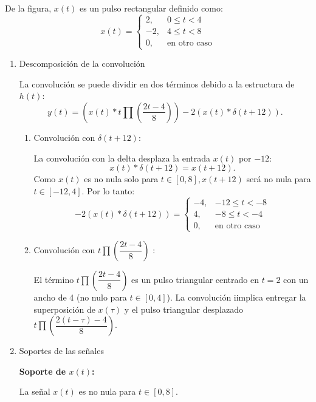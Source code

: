 \begin{enumerate}[label=\color{red}\textbf{\arabic*)}]
\begin{enumerate}[label=\color{red}\textbf{\alph*)}]
        De la figura, $x(t)$ es un pulso rectangular definido como:  \[
        x(t)=\begin{cases}
            2, & 0\le t<4\\
            -2, & 4\le t<8\\
            0, & \text{en otro caso}
        \end{cases}
        \] 
        \begin{enumerate}[label=Paso \arabic*:]
            \item Descomposición de la convolución

                La convolución se puede dividir en dos términos debido a la estructura de $h(t)$:
                 \[
                y(t)=\left( x(t)\ast t\prod\left( \dfrac{2t-4}{8} \right)  \right) -2(x(t)\ast\delta(t+12)).
                \] 
                \begin{enumerate}[label=\alph*)]
                    \item Convolución con $\delta(t+12)$:

                        La convolución con la delta desplaza la entrada  $x(t)$ por $-12$:  \[
                        x(t)\ast \delta(t+12)=x(t+12).
                        \] 
                        Como $x(t)$ es no nula solo para $t\in [0,8],x(t+12)$ será no nula para $t\in [-12,4]$. Por lo tanto: \[
                        -2(x(t)\ast\delta(t+12))=\begin{cases}
                            -4, & -12\le t<-8\\
                            4, & -8\le t<-4\\
                            0, & \text{en otro caso}
                        \end{cases}
                        \] 
                    \item Convolución con $t\prod\left( \dfrac{2t-4}{8} \right) $ :

                        El término $t\prod\left( \dfrac{2t-4}{8} \right) $ es un pulso triangular centrado en $t=2$ con un ancho de 4 (no nulo para $t\in [0,4]$). La convolución iimplica entregar la superposición de $x(\tau)$ y el pulso triangular desplazado $t\prod\left( \dfrac{2(t-\tau)-4}{8} \right) $.
                \end{enumerate}
            \item Soportes de las señales

                \textbf{Soporte de $x(t)$:}

                La señal $x(t)$ es no nula para  $t\in [0,8]$.


\end{enumerate}
\end{enumerate}
\end{enumerate}
